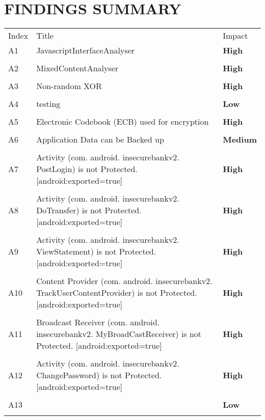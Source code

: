 \documentclass[12p]{article}
\begin{document}
\section{FINDINGS SUMMARY}\label{sec:summary}
	\begin{longtable}{p{0.5cm} p{10cm} p{1.5cm}}
	\rowcolor{grannysmithapple!70} Index & Title & Impact \\
	A1&JavascriptInterfaceAnalyser& \color{ferrarired}\textbf{High} \\
\hline\\	A2&MixedContentAnalyser& \color{ferrarired}\textbf{High} \\
\hline\\	A3&Non-random XOR& \color{ferrarired}\textbf{High} \\
\hline\\	A4&testing& \color{amber}\textbf{Low} \\
\hline\\	A5&Electronic Codebook \newline (ECB) used for encryption& \color{ferrarired}\textbf{High} \\
\hline\\	A6&Application Data can be Backed up& \color{orange(colorwheel)}\textbf{Medium} \\
\hline\\	A7&Activity \newline (com. android. insecurebankv2. PostLogin) is not Protected. [android:exported=true]& \color{ferrarired}\textbf{High} \\
\hline\\	A8&Activity \newline (com. android. insecurebankv2. DoTransfer) is not Protected. [android:exported=true]& \color{ferrarired}\textbf{High} \\
\hline\\	A9&Activity \newline (com. android. insecurebankv2. ViewStatement) is not Protected. [android:exported=true]& \color{ferrarired}\textbf{High} \\
\hline\\	A10&Content Provider \newline (com. android. insecurebankv2. TrackUserContentProvider) is not Protected. [android:exported=true]& \color{ferrarired}\textbf{High} \\
\hline\\	A11&Broadcast Receiver \newline (com. android. insecurebankv2. MyBroadCastReceiver) is not Protected. [android:exported=true]& \color{ferrarired}\textbf{High} \\
\hline\\	A12&Activity \newline (com. android. insecurebankv2. ChangePassword) is not Protected. [android:exported=true]& \color{ferrarired}\textbf{High} \\
\hline\\	A13&& \color{amber}\textbf{Low} \\
\hline\\	\end{longtable}
\cleardoublepage
\end{document}
